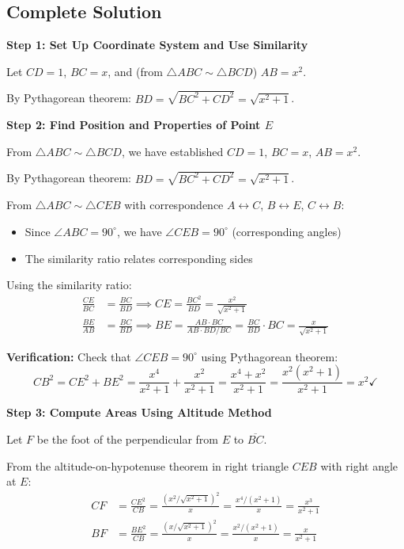 \documentclass[]{article}
\begin{document}
\begin{solutionbox}
\subsection*{Complete Solution}

\textbf{Step 1: Set Up Coordinate System and Use Similarity}

Let $CD = 1$, $BC = x$, and (from $\triangle ABC \sim \triangle BCD$) $AB = x^2$.

By Pythagorean theorem: $BD = \sqrt{BC^2 + CD^2} = \sqrt{x^2 + 1}$.

\textbf{Step 2: Find Position and Properties of Point $E$}

From $\triangle ABC \sim \triangle BCD$, we have established $CD = 1$, $BC = x$, $AB = x^2$.

By Pythagorean theorem: $BD = \sqrt{BC^2 + CD^2} = \sqrt{x^2 + 1}$.

From $\triangle ABC \sim \triangle CEB$ with correspondence $A \leftrightarrow C$, $B \leftrightarrow E$, $C \leftrightarrow B$:
\begin{itemize}
    \item Since $\angle ABC = 90^\circ$, we have $\angle CEB = 90^\circ$ (corresponding angles)
    \item The similarity ratio relates corresponding sides
\end{itemize}

Using the similarity ratio:
\begin{align*}
    \frac{CE}{BC} &= \frac{BC}{BD} \implies CE = \frac{BC^2}{BD} = \frac{x^2}{\sqrt{x^2+1}} \\
    \frac{BE}{AB} &= \frac{BC}{BD} \implies BE = \frac{AB \cdot BC}{AB \cdot BD/BC} = \frac{BC}{BD} \cdot BC = \frac{x}{\sqrt{x^2+1}}
\end{align*}

\textbf{Verification:} Check that $\angle CEB = 90^\circ$ using Pythagorean theorem:
\[CB^2 = CE^2 + BE^2 = \frac{x^4}{x^2+1} + \frac{x^2}{x^2+1} = \frac{x^4 + x^2}{x^2+1} = \frac{x^2(x^2+1)}{x^2+1} = x^2 \checkmark\]

\textbf{Step 3: Compute Areas Using Altitude Method}

Let $F$ be the foot of the perpendicular from $E$ to $\overline{BC}$.

From the altitude-on-hypotenuse theorem in right triangle $CEB$ with right angle at $E$:
\begin{align*}
    CF &= \frac{CE^2}{CB} = \frac{(x^2/\sqrt{x^2+1})^2}{x} = \frac{x^4/(x^2+1)}{x} = \frac{x^3}{x^2+1} \\
    BF &= \frac{BE^2}{CB} = \frac{(x/\sqrt{x^2+1})^2}{x} = \frac{x^2/(x^2+1)}{x} = \frac{x}{x^2+1}
\end{align*}


\end{solutionbox}
\end{document}
